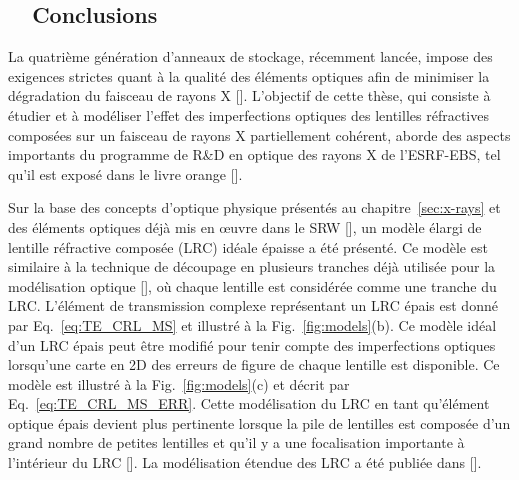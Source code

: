 \begin{refsection}\renewcommand{\thechapter}{7.fr}
\chapter{~~Conclusions}\label{sec:conclusion_fr}

La quatrième génération d'anneaux de stockage, récemment lancée, impose des exigences strictes quant à la qualité des éléments optiques afin de minimiser la dégradation du faisceau de rayons X [\cite{Schroer2014,Yabashi2014}]. L'objectif de cette thèse, qui consiste à étudier et à modéliser l'effet des imperfections optiques des lentilles réfractives composées sur un faisceau de rayons X partiellement cohérent, aborde des aspects importants du programme de R\&D en optique des rayons X de l'ESRF-EBS, tel qu'il est exposé dans le livre orange [\cite{orangebook}]. 

Sur la base des concepts d'optique physique présentés au chapitre~\ref{sec:x-rays} et des éléments optiques déjà mis en œuvre dans le SRW [\cite{Baltser2011}], un modèle élargi de lentille réfractive composée (LRC) idéale épaisse a été présenté. Ce modèle est similaire à la technique de découpage en plusieurs tranches déjà utilisée pour la modélisation optique [\cite{Li2017,Ali2020}], où chaque lentille est considérée comme une tranche du LRC. L'élément de transmission complexe représentant un LRC épais est donné par Eq.~\ref{eq:TE_CRL_MS} et illustré à la Fig.~\ref{fig:models}(b). Ce modèle idéal d'un LRC épais peut être modifié pour tenir compte des imperfections optiques lorsqu'une carte en 2D des erreurs de figure de chaque lentille est disponible. Ce modèle est illustré à la Fig.~\ref{fig:models}(c) et décrit par Eq.~\ref{eq:TE_CRL_MS_ERR}. Cette modélisation du LRC en tant qu'élément optique épais devient plus pertinente lorsque la pile de lentilles est composée d'un grand nombre de petites lentilles et qu'il y a une focalisation importante à l'intérieur du LRC [\cite{Schroer2005}]. La modélisation étendue des LRC a été publiée dans [\cite{Celestre2020}].


\end{refsection}
